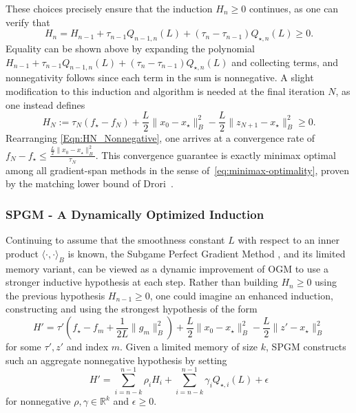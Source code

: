 \documentclass[11pt]{article}
\numberwithin{equation}{section}
\newcommand{\R}{\mathbb{R}}
\newcommand{\Ucoef}{\rho}
\newcommand{\Wcoef}{\gamma}
\newcommand{\idxMem}{k}
\newcommand{\dotB}[2]{\langle {#1}, {#2} \rangle_B}
\newcommand{\normB}[1]{\|{#1}\|_B}
\theoremstyle{definition}
\theoremstyle{plain}
\theoremstyle{definition}
\begin{document}
\noindent These choices precisely ensure that the induction $H_n \geq 0$ continues, as one can verify that
\begin{equation}
    H_n = H_{n-1} + \tau_{n-1}Q_{n-1,n}(L) + (\tau_n-\tau_{n-1}) Q_{\star, n}(L) \geq 0.
\end{equation}
Equality can be shown above by expanding the polynomial $H_{n-1} + \tau_{n-1}Q_{n-1,n}(L) + (\tau_n-\tau_{n-1}) Q_{\star, n}(L)$ and collecting terms, and nonnegativity follows since each term in the sum is nonnegative.
A slight modification to this induction and algorithm is needed at the final iteration $N$, as one instead defines
\begin{equation} \label{Eqn:HN_Nonnegative}
H_N := \tau_N (f_\star - f_N) + \frac{L}{2}\normB{x_0-x_\star}^2 - \frac{L}{2}\normB{z_{N+1}-x_\star}^2 \geq 0.
\end{equation}
Rearranging \eqref{Eqn:HN_Nonnegative}, one arrives at a convergence rate of 
$ f_N - f_\star \leq \frac{\frac{L}{2}\normB{x_0-x_\star}^2}{\tau_N}$. This convergence guarantee is exactly minimax optimal among all gradient-span methods in the sense of~\eqref{eq:minimax-optimality}, proven by the matching lower bound of Drori~\cite{Drori_OGMOptimal}.

\subsubsection{SPGM - A Dynamically Optimized Induction}  \label{SubSec:SPGM}
Continuing to assume that the smoothness constant $L$ with respect to an inner product $\dotB{\cdot}{\cdot}$ is known, the Subgame Perfect Gradient Method \cite{SPGM}, and its limited memory variant, can be viewed as a dynamic improvement of OGM to use a stronger inductive hypothesis at each step. Rather than building $H_n\geq 0$ using the previous hypothesis $H_{n-1} \geq 0$, one could imagine an enhanced induction, constructing and using the strongest hypothesis of the form
\begin{equation} \label{Eqn:HPrimeDef}
    H' = \tau'\left(f_\star - f_m + \frac{1}{2L}\normB{g_m}^2\right) + \frac{L}{2}\normB{x_0-x_\star}^2 - \frac{L}{2}\normB{z' - x_\star}^2
\end{equation}
for some $\tau',z'$ and index $m$. Given a limited memory of size $k$, SPGM constructs such an aggregate nonnegative hypothesis by setting
\begin{equation} \label{Eqn:HPrimeInduction}
    H' = \sum_{i=n-\idxMem}^{n-1} \Ucoef_i H_i + \sum_{i=n-\idxMem}^{n-1} \Wcoef_i Q_{\star, i}(L) + \epsilon
\end{equation}
for nonnegative $\Ucoef,\Wcoef \in \R^k$ and $\epsilon \geq 0$. 
\end{document}
